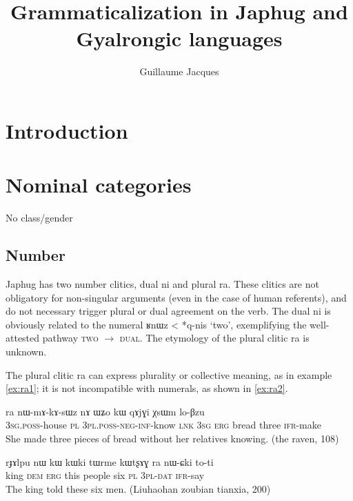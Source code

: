 \documentclass[oldfontcommands,oneside,a4paper,11pt]{article}
\newcommand{\ipa}[1]{{\phon #1}} %
\begin{document}
 
 \title{Grammaticalization in Japhug and Gyalrongic languages}
 \author{Guillaume Jacques}
 \maketitle  
 \section{Introduction}

 \section{Nominal categories} 
 
 No class/gender
\subsection{Number} 
Japhug has two number clitics, dual \ipa{ni} and plural \ipa{ra}. These clitics are not obligatory for non-singular arguments (even in the case of human referents), and do not necessary trigger plural or dual agreement on the verb. The dual \ipa{ni} is obviously related to the numeral \ipa{ʁnɯz} < *\ipa{q-nis} `two', exemplifying the well-attested pathway \textsc{two} $\rightarrow$ \textsc{dual}. The etymology of the plural clitic \ipa{ra} is unknown.
 
 
 The plural clitic \ipa{ra} can express plurality or collective meaning, as in example \ref{ex:ra1}; it is not incompatible with numerals, as shown in \ref{ex:ra2}.
 
\begin{exe}
\ex \label{ex:ra1}
\gll \ipa{ɯ-kha} 	\ipa{ra} 	\ipa{nɯ-mɤ-kɤ-sɯz} 	\ipa{nɤ} 	\ipa{ɯʑo} 	\ipa{kɯ} 	\ipa{qɤjɣi} 	\ipa{χsɯm} 	\ipa{lo-βzu} \\
\textsc{3sg.poss}-house \textsc{pl} \textsc{3pl.poss-neg-inf}-know \textsc{lnk} \textsc{3sg} \textsc{erg} bread three \textsc{ifr}-make \\
\glt She made three pieces of bread without her relatives knowing. (the raven, 108)
\end{exe}

\begin{exe}
\ex \label{ex:ra2}
\gll 
 \ipa{rɟɤlpu} 	\ipa{nɯ} 	\ipa{kɯ} 	\ipa{kɯki} 	\ipa{tɯrme} 	\ipa{kɯtʂɤɣ} 	\ipa{ra} 	\ipa{nɯ-ɕki}  	\ipa{to-ti} \\
 king \textsc{dem} \textsc{erg} this people six \textsc{pl} \textsc{3pl-dat} \textsc{ifr}-say  \\
 \glt The king told these six men. (Liuhaohan zoubian tianxia, 200)
\end{exe}
\end{document}
